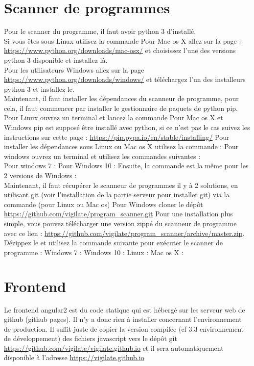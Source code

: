 \section{Scanner de programmes}
Pour le scanner du programme, il faut avoir python 3 d'installé.\\
Si vous êtes sous Linux utilisez la commande
Pour Mac os X allez sur la page : \url{https://www.python.org/downloads/mac-osx/} et choisissez l’une des versions python 3 disponible et installez là.\\
Pour les utilisateurs Windows allez sur la page \url{https://www.python.org/downloads/windows/} et téléchargez l’un des installeurs python 3 et installez le.
\\
Maintenant, il faut installer les dépendances du scanneur de programme, pour cela, il faut commencer par installer le gestionnaire de paquets de python pip. Pour Linux ouvrez un terminal et lancez la commande
Pour Mac os X et Windows pip est supposé être installé avec python, si ce n’est pas le cas suivez les instructions sur cette page : \url{https://pip.pypa.io/en/stable/installing/}
Pour installer les dépendances sous Linux ou Mac os X utilisez la commande :
Pour windows ouvrez un terminal et utilisez les commandes suivantes :\\
Pour windows 7 :
Pour Windows 10 :
Ensuite, la commande est la même pour les 2 versions de Windows :
\\
Maintenant, il faut récupérer le scanneur de programmes il y à 2 solutions, en utilisant git (voir l’installation de la partie serveur pour installer git) via la commande (pour Linux ou Mac os)
Pour Windows cloner le dépôt \url{https://github.com/vigilate/program_scanner.git}
Pour une installation plus simple, vous pouvez télécharger une version zippé du scanneur de programme avec ce lien : \url{https://github.com/vigilate/program_scanner/archive/master.zip}.\\Dézippez le et utilisez la commande suivante pour exécuter le scanner de programme : Windows 7 : 
Windows 10 : 
Linux : 
Mac os X : 

\section{Frontend}
Le frontend angular2 est du code statique qui est hébergé sur les serveur web de github (github pages). Il n’y a donc rien à installer concernant l’environnement de production. Il suffit juste de copier la version compilée (cf 3.3 environnement de développement) des fichiers javascript vers le dépôt git \url{https://github.com/vigilate/vigilate.github.io} et il sera automatiquement disponible à l'adresse \url{https://vigilate.github.io}

